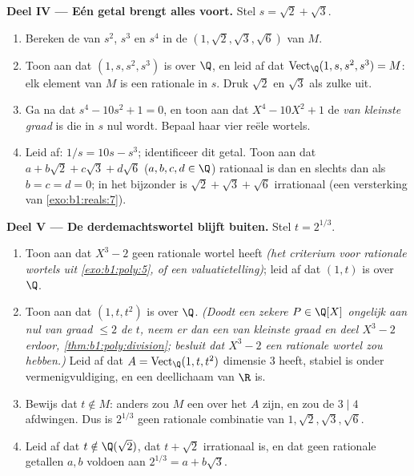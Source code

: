 \begin{problem}
\medskip
\noindent\textbf{Deel IV --- Eén getal brengt alles voort.} Stel
$s = \sqrt2 + \sqrt3$.
\begin{enumerate}[resume]
  \item Bereken de  van $s^2$, $s^3$ en $s^4$ in de
         $(1, \sqrt2, \sqrt3, \sqrt6)$ van $M$.
  \item Toon aan dat $(1, s, s^2, s^3)$  is over $\Q$, en leid
        af dat $\operatorname{Vect}_\Q(1, s, s^2, s^3) = M$: elk
        element van $M$ is een rationale  in $s$. Druk
        $\sqrt2$ en $\sqrt3$ als zulke  uit.
  \item Ga na dat $s^4 - 10s^2 + 1 = 0$, en toon aan dat $X^4 -
        10X^2 + 1$ de \emph{ van kleinste graad}
        is die in $s$ nul wordt. Bepaal haar vier reële wortels.
  \item Leid af: $1/s = 10s - s^3$; identificeer dit getal. Toon
        aan dat $a + b\sqrt2 + c\sqrt3 + d\sqrt6$ ($a,b,c,d \in
        \Q$) rationaal is dan en slechts dan als $b = c = d = 0$;
        in het bijzonder is $\sqrt2 + \sqrt3 + \sqrt6$ irrationaal
        (een versterking van \cref{exo:b1:reals:7}).
\end{enumerate}

\medskip
\noindent\textbf{Deel V --- De derdemachtswortel blijft
buiten.} Stel $t = 2^{1/3}$.
\begin{enumerate}[resume]
  \item Toon aan dat $X^3 - 2$ geen rationale wortel heeft \emph{(het
        criterium voor rationale wortels uit
        \cref{exo:b1:poly:5}, of een valuatietelling)}; leid af dat
        $(1, t)$  is over $\Q$.
  \item Toon aan dat $(1, t, t^2)$  is over $\Q$. \emph{(Doodt
        een zekere $P \in \Q[X]$ ongelijk aan nul van graad $\leq
        2$ de $t$, neem er dan een van kleinste graad en deel $X^3
        - 2$ erdoor, \cref{thm:b1:poly:division}; besluit dat $X^3
        - 2$ een rationale wortel zou hebben.)} Leid af dat $A =
        \operatorname{Vect}_\Q(1, t, t^2)$ dimensie $3$ heeft,
        stabiel is onder vermenigvuldiging, en een deellichaam van
        $\R$ is.
  \item Bewijs dat $t \notin M$: anders zou $M$ een 
        over het  $A$ zijn, en zou de  $3 \mid 4$
        afdwingen. Dus is $2^{1/3}$ geen rationale combinatie van
        $1, \sqrt2, \sqrt3, \sqrt6$.
  \item Leid af dat $t \notin \Q(\sqrt2)$, dat $t + \sqrt2$
        irrationaal is, en dat geen rationale getallen $a, b$
        voldoen aan $2^{1/3} = a + b\sqrt3$.
\end{enumerate}


\end{problem}
